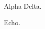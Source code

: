 \documentclass{article}
\begin{document}
\noindent Alpha Delta.\par
{\ttfamily Echo.}\par
\end{document}
